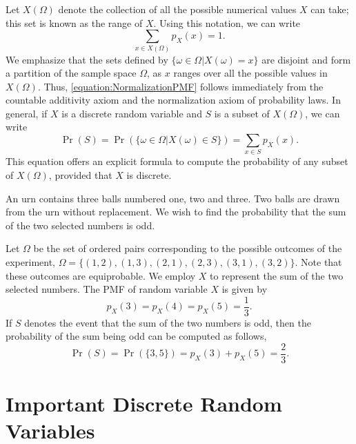 Let $X(\Omega)$ denote the collection of all the possible numerical values $X$ can take; this set is known as the range of $X$.
Using this notation, we can write
\begin{equation} \label{equation:NormalizationPMF}
\sum_{x \in X(\Omega)} p_X(x) = 1 .
\end{equation}
We emphasize that the sets defined by $\{ \omega \in \Omega | X(\omega) = x \}$ are disjoint and form a partition of the sample space $\Omega$, as $x$ ranges over all the possible values in $X (\Omega)$.
Thus, \eqref{equation:NormalizationPMF} follows immediately from the countable additivity axiom and the normalization axiom of probability laws.
In general, if $X$ is a discrete random variable and $S$ is a subset of $X(\Omega)$, we can write
\begin{equation} \label{equation:FunctionPMF}
\Pr (S) = \Pr \left( \{ \omega \in \Omega | X(\omega) \in S \} \right) = \sum_{x \in S} p_X (x) .
\end{equation}
This equation offers an explicit formula to compute the probability of any subset of $X (\Omega)$, provided that $X$ is discrete.

\begin{example}
An urn contains three balls numbered one, two and three.
Two balls are drawn from the urn without replacement.
We wish to find the probability that the sum of the two selected numbers is odd.

Let $\Omega$ be the set of ordered pairs corresponding to the possible outcomes of the experiment,
$\Omega = \{ (1, 2), (1, 3), (2, 1), (2, 3), (3, 1), (3, 2) \}$.
Note that these outcomes are equiprobable.
We employ $X$ to represent the sum of the two selected numbers.
The PMF of random variable $X$ is given by
\begin{equation*}
p_X (3) = p_X (4) = p_X (5) = \frac{1}{3}.
\end{equation*}
If $S$ denotes the event that the sum of the two numbers is odd, then the probability of the sum being odd can be computed as follows,
\begin{equation*}
\Pr (S) = \Pr ( \{ 3, 5 \} )
= p_X (3) + p_X (5) = \frac{2}{3} .
\end{equation*}
\end{example}


\section{Important Discrete Random Variables}

